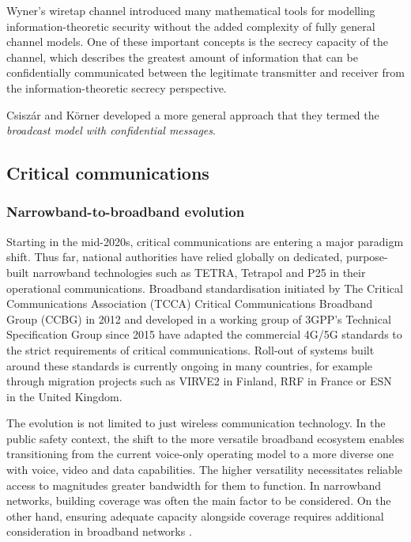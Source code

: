\documentclass[english, 12pt, a4paper, elec, utf8, a-1b, online]{aaltothesis}
\begin{document}
Wyner's wiretap channel introduced many mathematical tools for modelling information-theoretic security without the added complexity of fully general channel models.
One of these important concepts is the secrecy capacity of the channel, which describes the greatest amount of information that can be confidentially communicated between the legitimate transmitter and receiver from the information-theoretic secrecy perspective.
\cite{bloch2011physical}

Csiszár and Körner \cite{csiszar1978broadcast} developed a more general approach that they termed the \textit{broadcast model with confidential messages}.

\clearpage

\subsection{Critical communications}
\subsubsection{Narrowband-to-broadband evolution}
Starting in the mid-2020s, critical communications are entering a major paradigm shift. Thus far, national authorities have relied globally on dedicated, purpose-built narrowband technologies such as TETRA, Tetrapol and P25 in their operational communications. Broadband standardisation initiated by The Critical Communications Association (TCCA) Critical Communications Broadband Group (CCBG) in 2012 and developed in a working group of 3GPP’s Technical Specification Group since 2015 have adapted the commercial 4G/5G standards to the strict requirements of critical communications. Roll-out of systems built around these standards is currently ongoing in many countries, for example through migration projects such as VIRVE2 in Finland, RRF in France or ESN in the United Kingdom.

The evolution is not limited to just wireless communication technology. In the public safety context, the shift to the more versatile broadband ecosystem enables transitioning from the current voice-only operating model to a more diverse one with voice, video and data capabilities. The higher versatility necessitates reliable access to magnitudes greater bandwidth for them to function. In narrowband networks, building coverage was often the main factor to be considered. On the other hand, ensuring adequate capacity alongside coverage requires additional consideration in broadband networks \cite{saynevirta2021satellite}.
\end{document}
